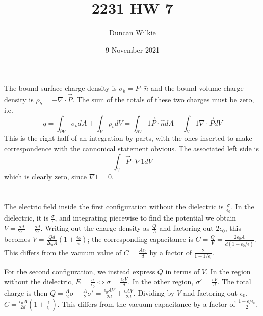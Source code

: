 \documentclass{article}
\title{2231 HW 7}
\author{Duncan Wilkie}
\date{9 November 2021}
\begin{document}
\maketitle

\section{}
The bound surface charge density is $\sigma_b=P\cdot\hat{n}$ and the bound volume charge density is $\rho_b=-\nabla\cdot \vec{P}$. The sum of the totals of these two charges must be zero, i.e.
\[q=\int_{\partial V}{\sigma_b}dA+\int_V{\rho_b}dV=\int_{\partial V}1{\vec{P}\cdot\hat{n}}dA-\int_V1{\nabla\cdot\vec{P}}dV\]
This is the right half of an integration by parts, with the ones inserted to make correspondence with the cannonical statement obvious. The associated left side is
\[\int_{V}\vec{P}\cdot \nabla 1 dV\]
which is clearly zero, since $\nabla 1 = 0$.

\section{}
The electric field inside the first configuration without the dielectric is $\frac{\sigma}{\epsilon_0}$. In the dielectric, it is $\frac{\sigma}{\epsilon}$, and integrating piecewise to find the potential we obtain $V=\frac{\sigma d}{2\epsilon_0}+\frac{\sigma d}{2\epsilon}$. Writing out the charge density as $\frac{Q}{A}$ and factoring out $2\epsilon_0$, this becomes $V=\frac{Qd}{2\epsilon_0A}\left( 1+\frac{\epsilon_0}{\epsilon} \right)$; the corresponding capacitance is $C=\frac{Q}{V}=\frac{2\epsilon_0A}{d(1+\epsilon_0/\epsilon)}$. This differs from the vacuum value of $C=\frac{A\epsilon_0}{d}$ by a factor of $\frac{2}{1+1/\epsilon_r}$.

For the second configuration, we instead express $Q$ in terms of $V$. In the region without the dielectric,  $E=\frac{\sigma}{\epsilon_0}\Leftrightarrow \sigma=\frac{\epsilon_0 V}{d}$. In the other region, $\sigma'=\frac{\epsilon V}{d}$.
The total charge is then $Q=\frac{A}{2}\sigma+\frac{A}{2}\sigma'=\frac{\epsilon_0A V}{2d}+\frac{\epsilon AV}{2d}$. Dividing by $V$ and factoring out $\epsilon_0$, $C=\frac{\epsilon_0 A}{2d}\left( 1+\frac{\epsilon}{\epsilon_0}\right)$. This differs from the vacuum capacitance by a factor of $\frac{1+\epsilon/\epsilon_0}{2}$.
\end{document}
